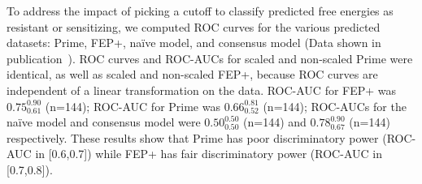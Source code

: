 \documentclass[phd,tocprelim]{cornell}
\renewcommand{\FIG}[1]{\autoref{fig:#1}}
\begin{document}
To address the impact of picking a cutoff to classify predicted free energies as resistant or sensitizing, we computed ROC curves for the various predicted datasets: Prime, FEP+, na{\"i}ve model, and consensus model (Data shown in publication~\citep{Hauser:2018vz}). ROC curves and ROC-AUCs for scaled and non-scaled Prime were identical, as well as scaled and non-scaled FEP+, because ROC curves are independent of a linear transformation on the data. %
ROC-AUC for FEP+ was $0.75_{0.61}^{0.90}$ (n=144); ROC-AUC for Prime was $0.66_{0.52}^{0.81}$ (n=144); ROC-AUCs for the na{\"i}ve model and consensus model were $0.50_{0.50}^{0.50}$ (n=144) and $0.78_{0.67}^{0.90}$ (n=144) respectively. These results show that Prime has poor discriminatory power (ROC-AUC in [0.6,0.7]) while FEP+ has fair discriminatory power (ROC-AUC in [0.7,0.8]).
\end{document}
